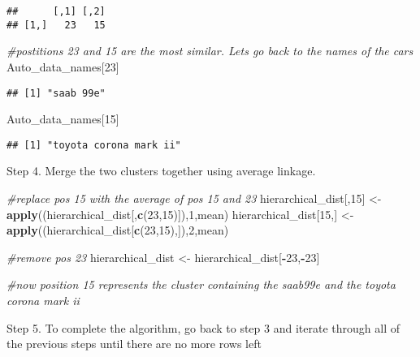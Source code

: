 \documentclass[11pt,]{article}
\newenvironment{Shaded}{\begin{snugshade}}{\end{snugshade}}
\newcommand{\CommentTok}[1]{\textcolor[rgb]{0.56,0.35,0.01}{\textit{#1}}}
\newcommand{\DecValTok}[1]{\textcolor[rgb]{0.00,0.00,0.81}{#1}}
\newcommand{\KeywordTok}[1]{\textcolor[rgb]{0.13,0.29,0.53}{\textbf{#1}}}
\newcommand{\NormalTok}[1]{#1}
\newcommand{\OperatorTok}[1]{\textcolor[rgb]{0.81,0.36,0.00}{\textbf{#1}}}
\newcommand{\StringTok}[1]{\textcolor[rgb]{0.31,0.60,0.02}{#1}}
\begin{document}
\begin{verbatim}
##      [,1] [,2]
## [1,]   23   15
\end{verbatim}

\begin{Shaded}
\begin{Highlighting}[]
\CommentTok{#postitions 23 and 15 are the most similar. Lets go back to the names of the cars}
\NormalTok{Auto_data_names[}\DecValTok{23}\NormalTok{]}
\end{Highlighting}
\end{Shaded}

\begin{verbatim}
## [1] "saab 99e"
\end{verbatim}

\begin{Shaded}
\begin{Highlighting}[]
\NormalTok{Auto_data_names[}\DecValTok{15}\NormalTok{]}
\end{Highlighting}
\end{Shaded}

\begin{verbatim}
## [1] "toyota corona mark ii"
\end{verbatim}

Step 4. Merge the two clusters together using average linkage.

\begin{Shaded}
\begin{Highlighting}[]
\CommentTok{#replace pos 15 with the average of pos 15 and 23}
\NormalTok{hierarchical_dist[,}\DecValTok{15}\NormalTok{] <-}\StringTok{ }\KeywordTok{apply}\NormalTok{((hierarchical_dist[,}\KeywordTok{c}\NormalTok{(}\DecValTok{23}\NormalTok{,}\DecValTok{15}\NormalTok{)]),}\DecValTok{1}\NormalTok{,mean)}
\NormalTok{hierarchical_dist[}\DecValTok{15}\NormalTok{,] <-}\StringTok{ }\KeywordTok{apply}\NormalTok{((hierarchical_dist[}\KeywordTok{c}\NormalTok{(}\DecValTok{23}\NormalTok{,}\DecValTok{15}\NormalTok{),]),}\DecValTok{2}\NormalTok{,mean)}

\CommentTok{#remove pos 23}
\NormalTok{hierarchical_dist <-}\StringTok{ }\NormalTok{hierarchical_dist[}\OperatorTok{-}\DecValTok{23}\NormalTok{,}\OperatorTok{-}\DecValTok{23}\NormalTok{]}

\CommentTok{#now position 15 represents the cluster containing the saab99e and the toyota corona mark ii}
\end{Highlighting}
\end{Shaded}

Step 5. To complete the algorithm, go back to step 3 and iterate through
all of the previous steps until there are no more rows left
\end{document}
